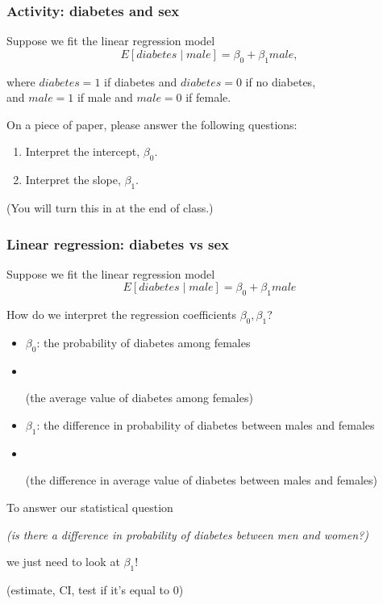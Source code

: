 \documentclass[12pt, 
hyperref={colorlinks=true, linkcolor=blue, urlcolor=cyan}]{beamer}
\begin{document}
\begin{frame}
\frametitle{Activity: diabetes and sex}

Suppose we fit the linear regression model $$E[diabetes \mid male] = \beta_0 + \beta_1 male,$$ \begin{footnotesize}where $diabetes = 1$ if diabetes and $diabetes = 0$ if no diabetes, \\ and $male = 1$ if male and $male = 0$ if female. \end{footnotesize}

\color{blue} On a piece of paper, please answer the following questions: 

\begin{enumerate}
\item \color{blue} Interpret the intercept, $\beta_0$.
\item Interpret the slope, $\beta_1$.
\end{enumerate} \color{black}

(You will turn this in at the end of class.)
\end{frame}

\begin{frame}
\frametitle{Linear regression: diabetes vs sex}

Suppose we fit the linear regression model $$E[diabetes \mid male] = \beta_0 + \beta_1 male$$

How do we interpret the regression coefficients $\beta_0, \beta_1$? \vspace{-0.3cm}

\begin{itemize}
\item \color{blue} $\beta_0$: \pause the probability of diabetes among females \pause \color{black}
\item[] \ \ \begin{scriptsize} (the average value of diabetes among females) \end{scriptsize} \pause
\item \color{blue} $\beta_1$: \pause the difference in probability of diabetes between males and females \pause \color{black}
\item[] \ \ \begin{scriptsize}(the difference in average value of diabetes between males and females) \pause \end{scriptsize}
\end{itemize}

\vspace{-0.3cm}
To answer our statistical question \begin{small}\textit{(is there a difference in probability of diabetes between men and women?)}\end{small} we just need to look at $\beta_1$! \begin{small} (estimate, CI, test if it's equal to 0) \end{small}
\end{frame}
\end{document}
